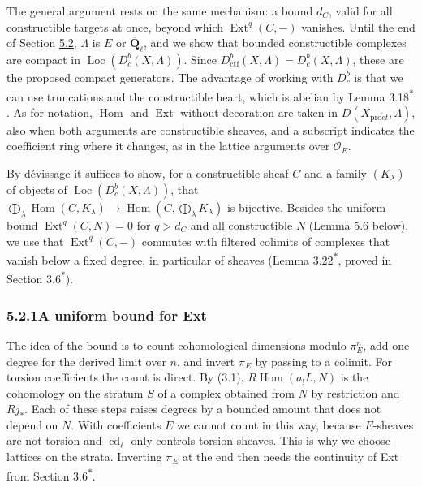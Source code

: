 \documentclass[11pt]{article}
\newcommand{\bpout}[1]{#1\textsuperscript{\hyperlink{bp-outside}{\ensuremath{\ast}}}}
\providecommand{\Dbc}{}\renewcommand{\Dbc}{D^b_c}
\providecommand{\Ext}{}\renewcommand{\Ext}{\operatorname{Ext}}
\providecommand{\Hom}{}\renewcommand{\Hom}{\operatorname{Hom}}
\providecommand{\Loc}{}\renewcommand{\Loc}{\operatorname{Loc}}
\begin{document}
\label{bp12}%
The general argument rests on the same mechanism: a bound \(d_C\), valid for all constructible targets at once, beyond which \(\Ext^q(C,-)\) vanishes. Until the end of Section \hyperref[bp9]{5.2}, \(\Lambda\) is \(E\) or \(\overline{\mathbf Q}_\ell\), and we show that bounded constructible complexes are compact in \(\Loc(\Dbc(X,\Lambda))\). Since \(D^b_{\mathrm{ctf}}(X,\Lambda)=\Dbc(X,\Lambda)\), these are the proposed compact generators. The advantage of working with \(\Dbc\) is that we can use truncations and the constructible heart, which is abelian by Lemma \bpout{3.18}. As for notation, \(\Hom\) and \(\Ext\) without decoration are taken in \(D(X_{\mathrm{pro}\acute{e}t},\Lambda)\), also when both arguments are constructible sheaves, and a subscript indicates the coefficient ring where it changes, as in the lattice arguments over \(\mathcal O_E\).

By dévissage it suffices to show, for a constructible sheaf \(C\) and a family \((K_\lambda)\) of objects of \(\Loc(\Dbc(X,\Lambda))\), that \(\bigoplus_\lambda\Hom(C,K_\lambda)\to\Hom(C,\bigoplus_\lambda K_\lambda)\) is bijective. Besides the uniform bound \(\Ext^q(C,N)=0\) for \(q>d_C\) and all constructible \(N\) (Lemma \hyperref[bp20]{5.6} below), we use that \(\Ext^q(C,-)\) commutes with filtered colimits of complexes that vanish below a fixed degree, in particular of sheaves (Lemma \bpout{3.22}, proved in Section \bpout{3.6}).

\subsubsection*{\texorpdfstring{5.2.1\quad A uniform bound for Ext}{5.2.1 A uniform bound for Ext}}
\label{bp13}%
\label{bp14}%
The idea of the bound is to count cohomological dimensions modulo \(\pi_E^n\), add one degree for the derived limit over \(n\), and invert \(\pi_E\) by passing to a colimit. For torsion coefficients the count is direct. By (3.1), \(R\!\operatorname{Hom}(a_!L,N)\) is the cohomology on the stratum \(S\) of a complex obtained from \(N\) by restriction and \(Rj_*\). Each of these steps raises degrees by a bounded amount that does not depend on \(N\). With coefficients \(E\) we cannot count in this way, because \(E\)-sheaves are not torsion and \(\operatorname{cd}_\ell\) only controls torsion sheaves. This is why we choose lattices on the strata. Inverting \(\pi_E\) at the end then needs the continuity of Ext from Section \bpout{3.6}.
\end{document}
